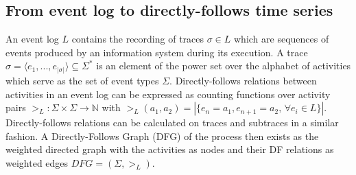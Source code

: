 \subsection{From event log to directly-follows time series}\label{sec:3a:preliminaries}

An event log $L$ contains the recording of traces $\sigma \in L$ which are sequences of events produced by an information system during its execution.
A trace $\sigma=\langle e_1,...,e_{|\sigma|}\rangle \subseteq \Sigma^*$ is an element of the power set over the alphabet of activities which serve as the set of event types $\Sigma$.
Directly-follows relations between activities in an event log can be expressed as counting functions over activity pairs $>_L: \Sigma\times\Sigma \to \mathbb{N}$ with $>_L(a_1,a_2) = |\{e_n=a_1,e_{n+1}=a_2, \,\forall e_i\in L\}|$.
Directly-follows relations can be calculated on traces and subtraces in a similar fashion.
A Directly-Follows Graph (DFG) of the process then exists as the weighted directed graph with the activities as nodes and their DF relations as weighted edges $DFG=(\Sigma,>_L)$.

